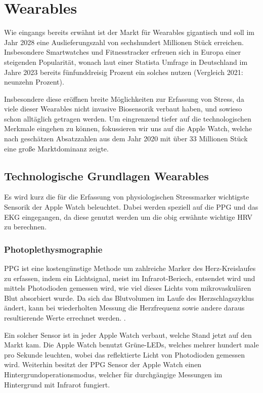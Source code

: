 \section{Wearables}

Wie eingangs bereits erwähnt ist der Markt für Wearables gigantisch und soll im Jahr 2028 eine Auslieferungszahl von sechshundert Millionen Stück erreichen. Insbesondere Smartwatches und 
Fitnesstracker erfreuen sich in Europa einer steigenden Popularität, wonach laut einer Statista Umfrage in Deutschland im Jahre 2023 bereits fünfunddreisig Prozent ein solches nutzen (Vergleich 2021: neunzehn Prozent). \cite{bocksch2023nutzung}

Insbesondere diese eröffnen breite Möglichkeiten zur Erfassung von Stress, da viele dieser Wearables nicht invasive Biosensorik verbaut haben, und sowieso schon alltäglich getragen werden. Um eingrenzend tiefer auf die technologischen Merkmale eingehen 
zu können, fokussieren wir uns auf die Apple Watch, welche nach geschätzen Absatzzahlen aus dem Jahr 2020 mit über 33 Millionen Stück eine große Marktdominanz zeigte. \cite{bocksch2021apple}



\subsection{Technologische Grundlagen Wearables}

Es wird kurz die für die Erfassung von physiologischen Stressmarker wichtigste Sensorik der Apple Watch beleuchtet. Dabei werden speziell auf die \ac{PPG} und das \ac{EKG} eingegangen, da diese genutzt werden um die obig erwähnte wichtige \ac{HRV} zu berechnen.

\subsubsection{Photoplethysmographie}
\ac{PPG} ist eine kostengünstige Methode um zahlreiche Marker des Herz-Kreislaufes zu erfassen, indem ein Lichtsignal, meist im Infrarot-Beriech, entsendet wird und mittels Photodioden gemessen wird, 
wie viel dieses Lichts vom mikrovaskulären Blut absorbiert wurde. Da sich das Blutvolumen im Laufe des Herzschlagszyklus ändert, 
kann bei wiederholten Messung die Herzfrequenz sowie andere daraus resultierende Werte errechnet werden. \cite{Allen2007}. 

Ein solcher Sensor ist in jeder Apple Watch verbaut, welche Stand jetzt auf den Markt kam. Die Apple Watch benutzt Grüne-LEDs, welches mehrer hundert male pro Sekunde leuchten, wobei das reflektierte Licht 
von Photodioden gemessen wird. Weiterhin besitzt der \ac{PPG} Sensor der Apple Watch einen Hintergrundoperationsmodus, welcher für durchgängige Messungen im Hintergrund mit Infrarot fungiert.

